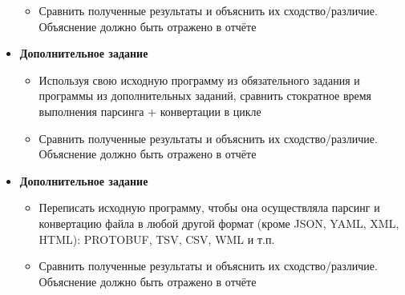 \begin{itemize}
\begin{itemize}
		\item Сравнить полученные результаты и объяснить их сходство/различие. Объяснение должно быть отражено в отчёте
	\end{itemize}
	
	\item \textbf{Дополнительное задание }
	\begin{itemize}
		\item Используя свою исходную программу из обязательного задания и программы из дополнительных заданий, сравнить стократное время выполнения парсинга + конвертации в цикле
		
		\item Сравнить полученные результаты и объяснить их сходство/различие. Объяснение должно быть отражено в отчёте
	\end{itemize}
	
	\item \textbf{Дополнительное задание }
	\begin{itemize}
		\item Переписать исходную программу, чтобы она осуществляла парсинг и конвертацию  файла в любой другой формат (кроме JSON, YAML, XML, HTML): PROTOBUF, TSV, CSV, WML и т.п.
		
		\item Сравнить полученные результаты и объяснить их сходство/различие. Объяснение должно быть отражено в отчёте
	\end{itemize}
\end{itemize}
